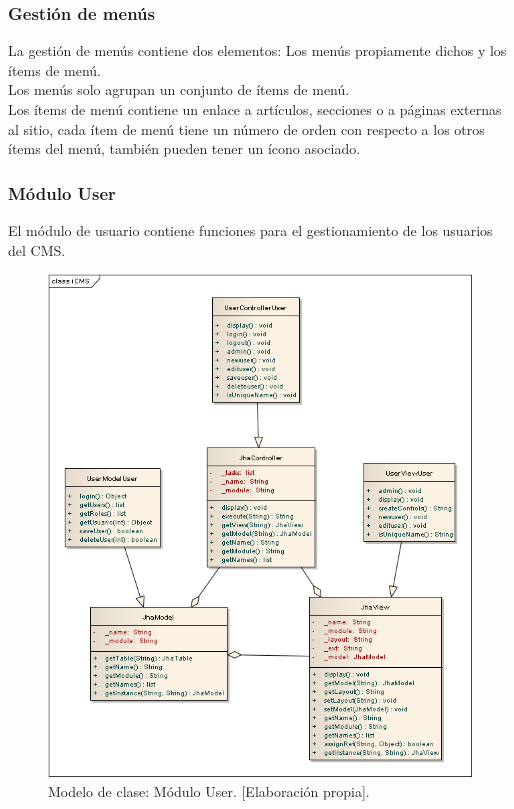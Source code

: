 \subsubsection{Gesti\'on de men\'us}
La gesti\'on de men\'us contiene dos elementos: Los men\'us propiamente dichos y los \'items de men\'u.\\
Los men\'us solo agrupan un conjunto de \'items de men\'u.\\
Los \'items de men\'u contiene un enlace a art\'iculos, secciones o a p\'aginas externas al sitio, cada \'item de men\'u tiene un n\'umero de orden con respecto a los otros \'items del men\'u, tambi\'en pueden tener un \'icono asociado.

\subsubsection{M\'odulo User}
El m\'odulo de usuario contiene funciones para el gestionamiento de los usuarios del CMS.

\begin{figure}[h]
\centering
\includegraphics[scale=.4, keepaspectratio=true]{imagenes/16_imagen.png}
\caption{Modelo de clase: M\'odulo User. [Elaboraci\'on propia].}
\end{figure}

